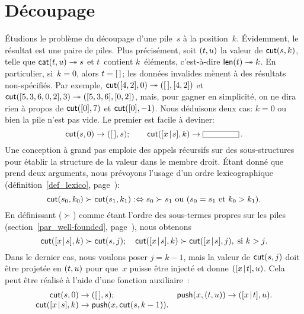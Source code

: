 \section{Découpage}
\label{sec_cutting}

 Étudions le problème du découpage d'une
pile~\(s\) à la position~\(k\). Évidemment, le résultat est une paire
de piles. Plus précisément, soit \(({t},{u})\) la valeur de
\(\textsf{cut}(s,k)\), telle que \(\textsf{cat}(t,u) \twoheadrightarrow
s\) et \(t\)~contient \(k\)~éléments,
c'est-à-dire \(\textsf{len}(t) \twoheadrightarrow k\). En particulier,
si~\(k = 0\), alors \(t = [\,]\); les données invalides mènent à des
résultats non-spécifiés. Par exemple, \(\textsf{cut}([4,2],0)
\twoheadrightarrow ({[\,]},{[4,2]})\) et \(\textsf{cut}([5,3,6,0,2],3)
\twoheadrightarrow ({[5,3,6]},{[0,2]})\), mais, pour gagner en
simplicité, on ne dira rien à propos de \(\textsf{cut}([0],7)\) et
\(\textsf{cut}([0],-1)\). Nous déduisons deux cas: \(k = 0\) ou bien la
pile n'est pas vide. Le premier est facile à deviner:
\begin{equation*}
\fun{cut}(s,0)           \rightarrow \pair{\el}{s};\qquad
\fun{cut}(\cons{x}{s},k) \rightarrow \fbcode{CCCCCC}\,.
\end{equation*}
Une conception à grand pas emploie des
appels récursifs sur des sous-structures pour établir la structure de
la valeur dans le membre droit. Étant donné que  prend deux
arguments, nous prévoyons l'usage d'un ordre lexicographique 
(définition~\eqref{def_lexico}, page~\pageref{def_lexico}):
\begin{equation*}
\textsf{cut}(s_0,k_0) \succ \textsf{cut}(s_1,k_1)
:\Leftrightarrow 
\text{\(s_0 \succ s_1\) ou (\(s_0 = s_1\) et \(k_0 > k_1\))}.
\end{equation*}
En définissant (\(\succ\)) comme étant l'ordre des sous-termes
propres sur les piles
(section~\ref{par_well-founded}, page~\pageref{par_well-founded}),
nous obtenons
\begin{equation*}
\textsf{cut}([{x}\!\mid\!{s}],k) \succ \textsf{cut}(s,j);\quad
\textsf{cut}([{x}\!\mid\!{s}],k) \succ \textsf{cut}([{x}\!\mid\!{s}],j),\;
\text{si \(k > j\)}.
\end{equation*}
Dans le dernier cas, nous voulons poser \(j=k-1\), mais la valeur de
\(\textsf{cut}(s,j)\) doit être projetée en \(({t},{u})\) pour
que~\(x\) puisse être injecté et donne \(({[{x}\!\mid\!{t}]},{u})\). Cela
peut être réalisé à l'aide d'une fonction
auxiliaire~:
\begin{equation*}
\begin{array}{@{}r@{\;}l@{\;}lr@{\;}l@{\;}l@{}}
\fun{cut}(s,0) & \rightarrow & \pair{\el}{s};
& \fun{push}(x,\pair{t}{u}) & \rightarrow & \pair{\cons{x}{t}}{u}.\\
\fun{cut}(\cons{x}{s},k) & \rightarrow 
& \fun{push}(x,\fun{cut}(s,k-1)).
\end{array}
\end{equation*}


